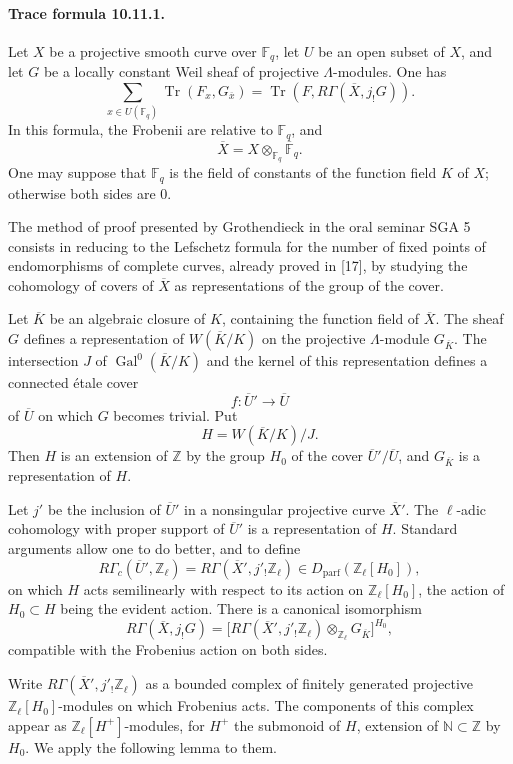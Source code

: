 \documentclass[10pt,letterpaper]{article}
\newcommand{\Z}{\mathbb Z}
\newcommand{\F}{\mathbb F}
\newcommand{\Gal}{\operatorname{Gal}}
\newcommand{\Tr}{\operatorname{Tr}}
\providecommand{\Gal}{\operatorname{Gal}}
\providecommand{\Gal}{\operatorname{Gal}}
\providecommand{\Tr}{\operatorname{Tr}}
\providecommand{\Dparf}{D_{\mathrm{parf}}}
\providecommand{\Gal}{\operatorname{Gal}}
\providecommand{\Tr}{\operatorname{Tr}}
\providecommand{\Gal}{\operatorname{Gal}}
\providecommand{\Tr}{\operatorname{Tr}}
\begin{document}
\paragraph{Trace formula 10.11.1.} Let \(X\) be a projective smooth curve over \(\F_q\), let \(U\) be an open subset of \(X\), and let \(G\) be a locally constant Weil sheaf of projective \(\Lambda\)-modules. One has
\[
\sum_{x\in U(\F_q)}\Tr(F_x,G_{\overline x})
=
\Tr(F,R\Gamma(\overline X,j_!G)).
\]
In this formula, the Frobenii are relative to \(\F_q\), and
\[
\overline X=X\otimes_{\F_q}\overline{\F}_q.
\]
One may suppose that \(\F_q\) is the field of constants of the function field \(K\) of \(X\); otherwise both sides are \(0\).

The method of proof presented by Grothendieck in the oral seminar SGA 5 consists in reducing to the Lefschetz formula for the number of fixed points of endomorphisms of complete curves, already proved in [17], by studying the cohomology of covers of \(\overline X\) as representations of the group of the cover.

Let \(\overline K\) be an algebraic closure of \(K\), containing the function field of \(\overline X\). The sheaf \(G\) defines a representation of \(W(\overline K/K)\) on the projective \(\Lambda\)-module \(G_{\overline K}\). The intersection \(J\) of \(\Gal^0(\overline K/K)\) and the kernel of this representation defines a connected étale cover
\[
f:\overline U'\longrightarrow \overline U
\]
of \(\overline U\) on which \(G\) becomes trivial. Put
\[
H=W(\overline K/K)/J.
\]
Then \(H\) is an extension of \(\Z\) by the group \(H_0\) of the cover \(\overline U'/\overline U\), and \(G_{\overline K}\) is a representation of \(H\).

Let \(j'\) be the inclusion of \(\overline U'\) in a nonsingular projective curve \(\overline X'\). The \(\ell\)-adic cohomology with proper support of \(\overline U'\) is a representation of \(H\). Standard arguments allow one to do better, and to define
\[
R\Gamma_c(\overline U',\Z_\ell)
=
R\Gamma(\overline X',j'_!\Z_\ell)
\in\Dparf(\Z_\ell[H_0]),
\]
on which \(H\) acts semilinearly with respect to its action on \(\Z_\ell[H_0]\), the action of \(H_0\subset H\) being the evident action. There is a canonical isomorphism
\[
\tag{10.11.2}
R\Gamma(\overline X,j_!G)
=
\bigl[
R\Gamma(\overline X',j'_!\Z_\ell)
\otimes_{\Z_\ell}G_{\overline K}
\bigr]^{H_0},
\]
compatible with the Frobenius action on both sides.

Write \(R\Gamma(\overline X',j'_!\Z_\ell)\) as a bounded complex of finitely generated projective \(\Z_\ell[H_0]\)-modules on which Frobenius acts. The components of this complex appear as \(\Z_\ell[H^+]\)-modules, for \(H^+\) the submonoid of \(H\), extension of \(\mathbb N\subset\Z\) by \(H_0\). We apply the following lemma to them.
\end{document}
